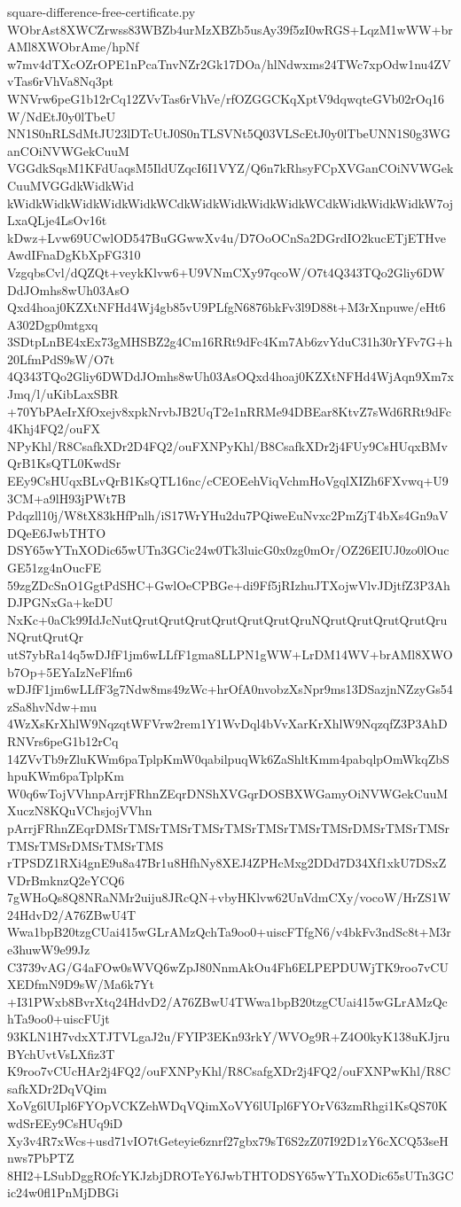\documentclass[11pt]{article}
\theoremstyle{definition}
\theoremstyle{remark}
\begin{document}
\begin{filecontents*}[overwrite]{square-difference-free-certificate.py}
WObrAst8XWCZrwss83WBZb4urMzXBZb5usAy39f5zI0wRGS+LqzM1wWW+brAMl8XWObrAme/hpNf
w7mv4dTXcOZrOPE1nPcaTnvNZr2Gk17DOa/hlNdwxms24TWc7xpOdw1nu4ZVvTas6rVhVa8Nq3pt
WNVrw6peG1b12rCq12ZVvTas6rVhVe/rfOZGGCKqXptV9dqwqteGVb02rOq16W/NdEtJ0y0lTbeU
NN1S0nRLSdMtJU23lDTcUtJ0S0nTLSVNt5Q03VLScEtJ0y0lTbeUNN1S0g3WGanCOiNVWGekCuuM
VGGdkSqsM1KFdUaqsM5IldUZqcI6I1VYZ/Q6n7kRhsyFCpXVGanCOiNVWGekCuuMVGGdkWidkWid
kWidkWidkWidkWidkWidkWCdkWidkWidkWidkWidkWCdkWidkWidkWidkW7ojLxaQLje4LsOv16t
kDwz+Lvw69UCwlOD547BuGGwwXv4u/D7OoOCnSa2DGrdIO2kucETjETHveAwdIFnaDgKbXpFG310
VzgqbsCvl/dQZQt+veykKlvw6+U9VNmCXy97qcoW/O7t4Q343TQo2Gliy6DWDdJOmhs8wUh03AsO
Qxd4hoaj0KZXtNFHd4Wj4gb85vU9PLfgN6876bkFv3l9D88t+M3rXnpuwe/eHt6A302Dgp0mtgxq
3SDtpLnBE4xEx73gMHSBZ2g4Cm16RRt9dFc4Km7Ab6zvYduC31h30rYFv7G+h20LfmPdS9sW/O7t
4Q343TQo2Gliy6DWDdJOmhs8wUh03AsOQxd4hoaj0KZXtNFHd4WjAqn9Xm7xJmq/l/uKibLaxSBR
+70YbPAeIrXfOxejv8xpkNrvbJB2UqT2e1nRRMe94DBEar8KtvZ7sWd6RRt9dFc4Khj4FQ2/ouFX
NPyKhl/R8CsafkXDr2D4FQ2/ouFXNPyKhl/B8CsafkXDr2j4FUy9CsHUqxBMvQrB1KsQTL0KwdSr
EEy9CsHUqxBLvQrB1KsQTL16nc/cCEOEehViqVchmHoVgqlXIZh6FXvwq+U93CM+a9lH93jPWt7B
Pdqzll10j/W8tX83kHfPnlh/iS17WrYHu2du7PQiweEuNvxc2PmZjT4bXs4Gn9aVDQeE6JwbTHTO
DSY65wYTnXODic65wUTn3GCic24w0Tk3luicG0x0zg0mOr/OZ26EIUJ0zo0lOucGE51zg4nOucFE
59zgZDcSnO1GgtPdSHC+GwlOeCPBGe+di9Ff5jRIzhuJTXojwVlvJDjtfZ3P3AhDJPGNxGa+keDU
NxKc+0aCk99IdJcNutQrutQrutQrutQrutQrutQrutQruNQrutQrutQrutQrutQruNQrutQrutQr
utS7ybRa14q5wDJfF1jm6wLLfF1gma8LLPN1gWW+LrDM14WV+brAMl8XWOb7Op+5EYaIzNeFlfm6
wDJfF1jm6wLLfF3g7Ndw8ms49zWc+hrOfA0nvobzXsNpr9ms13DSazjnNZzyGs54zSa8hvNdw+mu
4WzXsKrXhlW9NqzqtWFVrw2rem1Y1WvDql4bVvXarKrXhlW9NqzqfZ3P3AhDRNVrs6peG1b12rCq
14ZVvTb9rZluKWm6paTplpKmW0qabilpuqWk6ZaShltKmm4pabqlpOmWkqZbShpuKWm6paTplpKm
W0q6wTojVVhnpArrjFRhnZEqrDNShXVGqrDOSBXWGamyOiNVWGekCuuMXuczN8KQuVChsjojVVhn
pArrjFRhnZEqrDMSrTMSrTMSrTMSrTMSrTMSrTMSrTMSrDMSrTMSrTMSrTMSrTMSrDMSrTMSrTMS
rTPSDZ1RXi4gnE9u8a47Br1u8HfhNy8XEJ4ZPHcMxg2DDd7D34Xf1xkU7DSxZVDrBmknzQ2eYCQ6
7gWHoQs8Q8NRaNMr2uiju8JRcQN+vbyHKlvw62UnVdmCXy/vocoW/HrZS1W24HdvD2/A76ZBwU4T
Wwa1bpB20tzgCUai415wGLrAMzQchTa9oo0+uiscFTfgN6/v4bkFv3ndSc8t+M3re3huwW9e99Jz
C3739vAG/G4aFOw0sWVQ6wZpJ80NnmAkOu4Fh6ELPEPDUWjTK9roo7vCUXEDfmN9D9sW/Ma6k7Yt
+I31PWxb8BvrXtq24HdvD2/A76ZBwU4TWwa1bpB20tzgCUai415wGLrAMzQchTa9oo0+uiscFUjt
93KLN1H7vdxXTJTVLgaJ2u/FYIP3EKn93rkY/WVOg9R+Z4O0kyK138uKJjruBYchUvtVsLXfiz3T
K9roo7vCUcHAr2j4FQ2/ouFXNPyKhl/R8CsafgXDr2j4FQ2/ouFXNPwKhl/R8CsafkXDr2DqVQim
XoVg6lUIpl6FYOpVCKZehWDqVQimXoVY6lUIpl6FYOrV63zmRhgi1KsQS70KwdSrEEy9CsHUq9iD
Xy3v4R7xWcs+usd71vIO7tGeteyie6znrf27gbx79sT6S2zZ07I92D1zY6cXCQ53seHnws7PbPTZ
8HI2+LSubDggROfcYKJzbjDROTeY6JwbTHTODSY65wYTnXODic65sUTn3GCic24w0fl1PnMjDBGi

\end{filecontents*}
\end{document}
